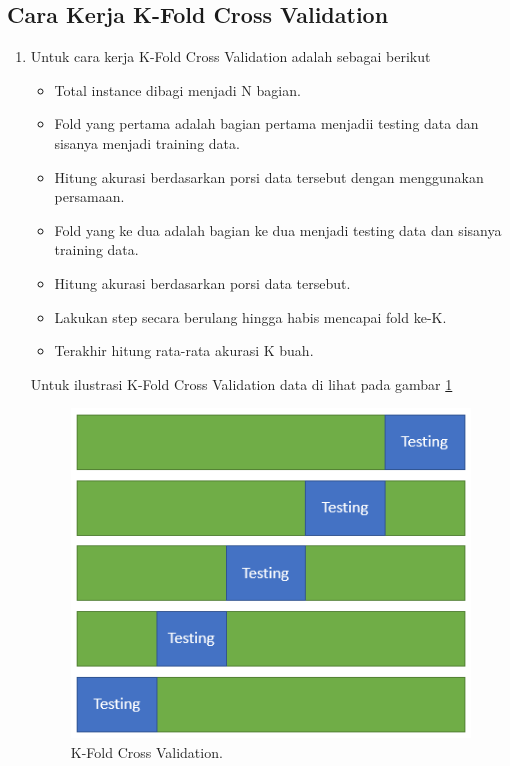 \subsection{Cara Kerja K-Fold Cross Validation}
\begin{enumerate}
\item Untuk cara kerja K-Fold Cross Validation adalah sebagai berikut
	\begin{itemize}
		\item Total instance dibagi menjadi N bagian.
		\item Fold yang pertama adalah bagian pertama menjadii testing data dan sisanya menjadi training data.
		\item Hitung akurasi berdasarkan porsi data tersebut dengan menggunakan persamaan.
		\item Fold yang ke dua adalah bagian ke dua menjadi testing data dan sisanya training data. 
		\item Hitung akurasi berdasarkan porsi data tersebut.
		\item Lakukan step secara berulang hingga habis mencapai fold ke-K.
		\item Terakhir hitung rata-rata akurasi K buah.
	\end{itemize}

\subitem Untuk ilustrasi K-Fold Cross Validation data di lihat pada gambar \ref{YNKF}
		\begin{figure}[ht]
		\centerline{\includegraphics[width=1\textwidth]{figures/YN/YN55.png}}
		\caption{K-Fold Cross Validation.}
		\label{YNKF}
		\end{figure}
\end{enumerate}

